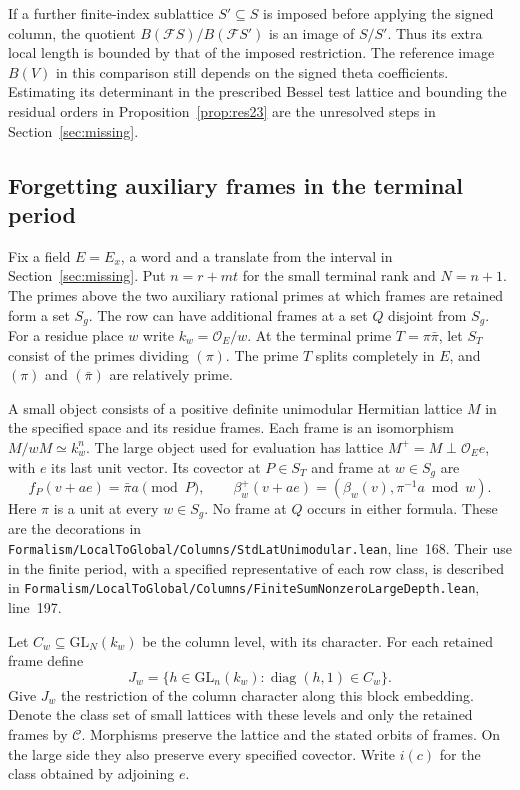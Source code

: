 \documentclass[a4paper,11pt]{article}
\theoremstyle{definition}
\theoremstyle{remark}
\newcommand{\srcloc}[2]{{\small\nolinkurl{#1.lean}}, line~#2}
\numberwithin{equation}{section}
\begin{document}
If a further finite-index sublattice \(S'\subseteq S\) is
imposed before applying the signed column, the quotient
\(B(\mathcal F S)/B(\mathcal F S')\) is an image of \(S/S'\).
Thus its extra local length is bounded by that of the imposed
restriction. The reference image \(B(V)\) in this comparison
still depends on the signed theta coefficients. Estimating
its determinant in the prescribed Bessel test lattice and
bounding the residual orders in Proposition~\ref{prop:res23}
are the unresolved steps in Section~\ref{sec:missing}.


\subsection{Forgetting auxiliary frames in the terminal period}
\label{sec:rowfibers380}

Fix a field \(E=E_x\), a word and a translate from the interval
in Section~\ref{sec:missing}. Put \(n=r+mt\) for the small terminal
rank and \(N=n+1\). The primes above the two auxiliary rational
primes at which frames are retained form a set \(S_g\). The row
can have additional frames at a set \(Q\) disjoint from \(S_g\).
For a residue place \(w\) write \(k_w=\mathcal O_E/w\).
At the terminal prime \(T=\pi\bar\pi\), let \(S_T\) consist
of the primes dividing \((\pi)\). The prime \(T\) splits completely
in \(E\), and \((\pi)\) and \((\bar\pi)\) are relatively prime.

A small object consists of a positive definite unimodular Hermitian
lattice \(M\) in the specified space and its residue frames.
Each frame is an isomorphism \(M/wM\simeq k_w^n\).
The large object used for evaluation has lattice
\(M^+=M\perp\mathcal O_E e\), with \(e\) its last unit vector.
Its covector at \(P\in S_T\) and frame at \(w\in S_g\) are
\[
 f_P(v+a e)=\bar\pi a\pmod P,\qquad
 \beta_w^+(v+a e)=(\beta_w(v),\pi^{-1}a\bmod w).
\]
Here \(\pi\) is a unit at every \(w\in S_g\). No frame at \(Q\)
occurs in either formula. These are the decorations in
\srcloc{Formalism/LocalToGlobal/Columns/StdLatUnimodular}{168}.
Their use in the finite period, with a specified representative of
each row class, is described in
\srcloc{Formalism/LocalToGlobal/Columns/FiniteSumNonzeroLargeDepth}{197}.

Let \(C_w\subseteq\mathrm{GL}_N(k_w)\) be the column level, with
its character. For each retained frame define
\[
 J_w=\{h\in\mathrm{GL}_n(k_w):\operatorname{diag}(h,1)\in C_w\}.
\]
Give \(J_w\) the restriction of the column character along this
block embedding. Denote the class set of small lattices with
these levels and only the retained frames by \(\mathcal C\).
Morphisms preserve the lattice and the stated orbits of frames.
On the large side they also preserve every specified covector.
Write \(i(c)\) for the class obtained by adjoining \(e\).
\end{document}
